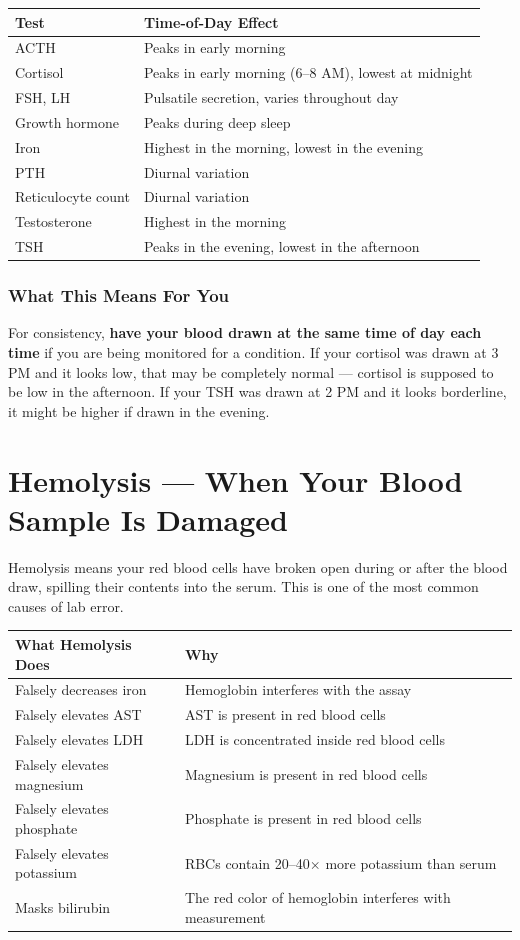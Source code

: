 \begin{longtable}{@{}ll@{}}
\toprule
\textbf{Test} & \textbf{Time-of-Day Effect} \\
\midrule
ACTH & Peaks in early morning \\
Cortisol & Peaks in early morning (6--8 AM), lowest at midnight \\
FSH, LH & Pulsatile secretion, varies throughout day \\
Growth hormone & Peaks during deep sleep \\
Iron & Highest in the morning, lowest in the evening \\
PTH & Diurnal variation \\
Reticulocyte count & Diurnal variation \\
Testosterone & Highest in the morning \\
TSH & Peaks in the evening, lowest in the afternoon \\
\bottomrule
\end{longtable}

\subsubsection{What This Means For You}

For consistency, \textbf{have your blood drawn at the same time of day each time} if you are being monitored for a condition. If your cortisol was drawn at 3 PM and it looks low, that may be completely normal --- cortisol is supposed to be low in the afternoon. If your TSH was drawn at 2 PM and it looks borderline, it might be higher if drawn in the evening.

\clearpage
\section{Hemolysis --- When Your Blood Sample Is Damaged}

Hemolysis means your red blood cells have broken open during or after the blood draw, spilling their contents into the serum. This is one of the most common causes of lab error.

\begin{longtable}{@{}ll@{}}
\toprule
\textbf{What Hemolysis Does} & \textbf{Why} \\
\midrule
Falsely decreases iron & Hemoglobin interferes with the assay \\
Falsely elevates AST & AST is present in red blood cells \\
Falsely elevates LDH & LDH is concentrated inside red blood cells \\
Falsely elevates magnesium & Magnesium is present in red blood cells \\
Falsely elevates phosphate & Phosphate is present in red blood cells \\
Falsely elevates potassium & RBCs contain 20--40$\times$ more potassium than serum \\
Masks bilirubin & The red color of hemoglobin interferes with measurement \\
\bottomrule
\end{longtable}

